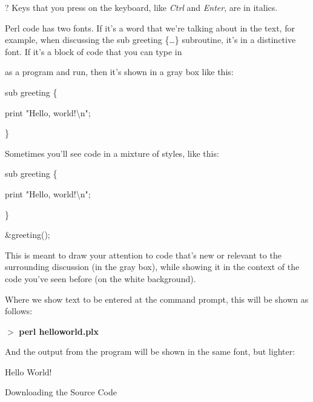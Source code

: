 \documentclass[a4paper,11pt]{book}
\begin{document}
\noindent ? Keys that you press on the keyboard, like \textit{Ctrl }and \textit{Enter}, are in italics.

\noindent 

\noindent 

\noindent Perl code has two fonts. If it's a word that we're talking about in the text, for example, when discussing the sub greeting \{\dots \} subroutine, it's in a distinctive font. If it's a block of code that you can type in

\noindent as a program and run, then it's shown in a gray box like this:

\noindent 

\noindent sub greeting \{

\noindent print "Hello, world!\textbackslash n";

\noindent \}

\noindent 

\noindent Sometimes you'll see code in a mixture of styles, like this:

\noindent 

\noindent sub greeting \{

\noindent print "Hello, world!\textbackslash n";

\noindent \}

\noindent 

\noindent \&greeting();

\noindent 

\noindent This is meant to draw your attention to code that's new or relevant to the surrounding discussion (in the gray box), while showing it in the context of the code you've seen before (on the white background).

\noindent 

\noindent 

\noindent Where we show text to be entered at the command prompt, this will be shown as follows:

\noindent 

\noindent $>$ \textbf{perl helloworld.plx}

\noindent 

\noindent And the output from the program will be shown in the same font, but lighter:

\noindent 

\noindent Hello World!

\noindent 

\noindent Downloading the Source Code

\noindent 
\end{document}
